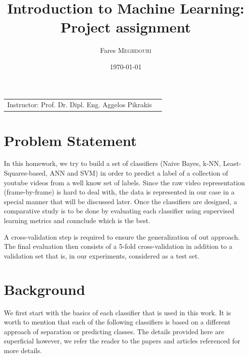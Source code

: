 \documentclass{article}
\title{Introduction to Machine Learning:\\ Project assignment} %
\author{Fares \textsc{Meghdouri}} %
\date{\today} %
\begin{document}
\maketitle %

\begin{center}
\begin{tabular}{l r}
Instructor: Prof. Dr. Dipl. Eng. Aggelos
Pikrakis %
\end{tabular}
\end{center}



\section{Problem Statement}
In this homework, we try to build a set of classifiers (Naive Bayes, k-NN, Least-Squares-based, ANN and SVM) in order to predict a label of a collection of youtube videos from a well know set of labels. Since the raw video representation (frame-by-frame) is hard to deal with, the data is represented in our case in a special manner that will be discussed later. Once the classifiers are designed, a comparative study is to be done by evaluating each classifier using supervised learning metrics and connclude which is the best.

A cross-validation step is required to ensure the generalization of out approach. The final evaluation then consists of a 5-fold cross-validation in addition to a validation set that is, in our experiments, considered as a test set.


\section{Background}
We first start with the basics of each classifier that is used in this work. It is worth to mention that each of the following classifiers is based on a different approach of separation or predicting classes. The details provided here are superficial however, we refer the reader to the papers and articles referenced for more details.
\end{document}
